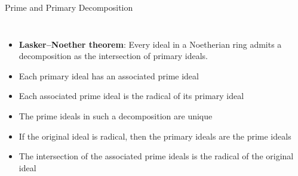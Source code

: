 \documentclass[11pt]{beamer}
\begin{document}
\begin{frame}{Prime and Primary Decomposition}
\begin{columns}
\begin{itemize}
  \item \textbf{Lasker–Noether theorem}: Every ideal in a Noetherian ring admits a decomposition as the intersection of primary ideals.
  \item Each primary ideal has an associated prime ideal
  \item Each associated prime ideal is the radical of its primary ideal
  \item The prime ideals in such a decomposition are unique
  \item If the original ideal is radical, then the primary ideals are the prime ideals
  \item The intersection of the associated prime ideals is the radical of the original ideal
\end{itemize}
\centering
\hspace*{-1in}
\end{columns}
\end{frame}
\end{document}
